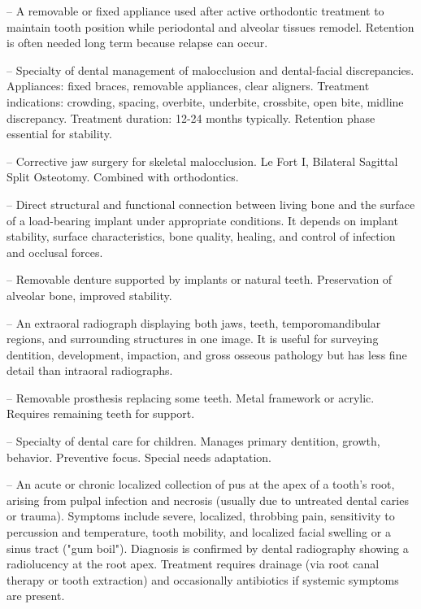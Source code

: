 -- A removable or fixed appliance used after active orthodontic treatment to maintain tooth position while periodontal and alveolar tissues remodel. Retention is often needed long term because relapse can occur.

-- Specialty of dental management of malocclusion and dental-facial discrepancies. Appliances: fixed braces, removable appliances, clear aligners. Treatment indications: crowding, spacing, overbite, underbite, crossbite, open bite, midline discrepancy. Treatment duration: 12-24 months typically. Retention phase essential for stability.

-- Corrective jaw surgery for skeletal malocclusion. Le Fort I, Bilateral Sagittal Split Osteotomy. Combined with orthodontics.

-- Direct structural and functional connection between living bone and the surface of a load-bearing implant under appropriate conditions. It depends on implant stability, surface characteristics, bone quality, healing, and control of infection and occlusal forces.

-- Removable denture supported by implants or natural teeth. Preservation of alveolar bone, improved stability.

-- An extraoral radiograph displaying both jaws, teeth, temporomandibular regions, and surrounding structures in one image. It is useful for surveying dentition, development, impaction, and gross osseous pathology but has less fine detail than intraoral radiographs.

-- Removable prosthesis replacing some teeth. Metal framework or acrylic. Requires remaining teeth for support.

-- Specialty of dental care for children. Manages primary dentition, growth, behavior. Preventive focus. Special needs adaptation.

-- An acute or chronic localized collection of pus at the apex of a tooth's root, arising from pulpal infection and necrosis (usually due to untreated dental caries or trauma). Symptoms include severe, localized, throbbing pain, sensitivity to percussion and temperature, tooth mobility, and localized facial swelling or a sinus tract ("gum boil"). Diagnosis is confirmed by dental radiography showing a radiolucency at the root apex. Treatment requires drainage (via root canal therapy or tooth extraction) and occasionally antibiotics if systemic symptoms are present.

